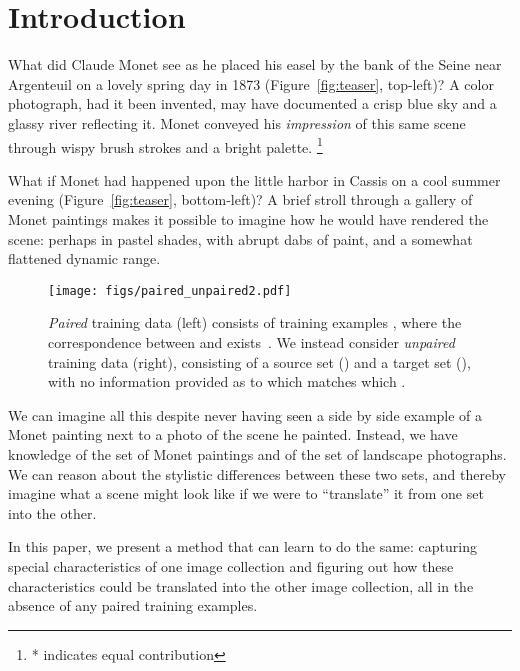 \documentclass[10pt,twocolumn,letterpaper]{article}
\newcommand\blfootnote[1]{\begingroup
  \renewcommand\thefootnote{}\footnote{#1}\addtocounter{footnote}{-1}\endgroup
}
\newcommand{\reffig}[1]{Figure~\ref{fig:#1}}
\newcommand{\lblfig}[1]{\label{fig:#1}}
\newcommand{\lblsec}[1]{\label{sec:#1}}
\begin{document}
\section{Introduction}
\lblsec{intro}

What did Claude Monet see as he placed his easel by the bank of the Seine near Argenteuil on a lovely spring day in 1873 (\reffig{teaser}, top-left)? A color photograph, had it been invented, may have documented a crisp blue sky and a glassy river reflecting it. Monet conveyed his {\em impression} of this same scene through wispy brush strokes and a bright palette.\blfootnote{* indicates equal contribution}

What if Monet had happened upon the little harbor in Cassis on a cool summer evening (\reffig{teaser}, bottom-left)? A brief stroll through a gallery of Monet paintings makes it possible to imagine how he would have rendered the scene: perhaps in pastel shades, with abrupt dabs of paint, and a somewhat flattened dynamic range.



\begin{figure}
 \centering
 \texttt{[image: figs/paired\_unpaired2.pdf]}
 \vspace{-0.3in}
  \caption{\emph{Paired} training data (left) consists of training examples , where the correspondence between  and  exists~\cite{isola2016image}. We instead consider \emph{unpaired} training data (right), consisting of a source set  () and a target set  (), with no information provided as to which  matches which .}
 \lblfig{paired_unpaired}
 \vspace{-0.2in}
\end{figure}

We can imagine all this despite never having seen a side by side example of a Monet painting next to a photo of the scene he painted. Instead, we have knowledge of the set of Monet paintings and of the set of landscape photographs. We can reason about the stylistic differences between these two sets, and thereby imagine what a scene might look like if we were to ``translate'' it from one set into the other.

In this paper, we present a method that can learn to do the same: capturing special characteristics of one image collection and figuring out how these characteristics could be translated into the other image collection, all in the absence of any paired training examples. 
\end{document}
